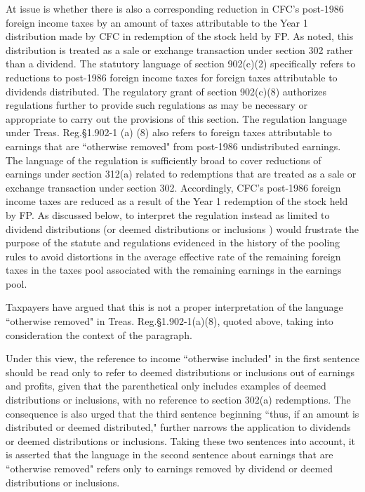 \begin{select}
At issue is whether there is also a corresponding reduction in CFC's post-1986 foreign income taxes by an amount of taxes attributable to the Year 1 distribution made by CFC in redemption of the stock held by FP. As noted, this distribution is treated as a sale or exchange transaction under section 302 rather than a dividend. The statutory language of section 902(c)(2)  specifically refers to reductions to post-1986 foreign income taxes for foreign taxes attributable to dividends distributed. The regulatory grant of section 902(c)(8) authorizes regulations further to provide such regulations as may be necessary or appropriate to carry out the provisions of this section. The regulation language under Treas. Reg.\@ \S1.902-1 (a) (8) also refers to foreign taxes attributable to earnings that are ``otherwise removed" from post-1986 undistributed earnings. The language of the regulation is sufficiently broad to cover reductions of earnings under section 312(a) related to redemptions that are treated as a sale or exchange transaction under section 302. Accordingly, CFC's post-1986 foreign income taxes are reduced as a result of the Year 1 redemption of the stock held by FP. As discussed below, to interpret the regulation instead as limited to dividend distributions (or deemed distributions or inclusions ) would frustrate the purpose of the statute and regulations evidenced in the history of the pooling rules to avoid distortions in the average effective rate of the remaining foreign taxes in the taxes pool associated with the remaining earnings in the earnings pool.

Taxpayers have argued that this is not a proper interpretation of the language ``otherwise removed" in Treas. Reg.\@ \S1.902-1(a)(8), quoted above, taking into consideration the context of the paragraph.

Under this view, the reference to income ``otherwise included" in the first sentence should be read only to refer to deemed distributions or inclusions out of earnings and profits, given that the parenthetical only includes examples of deemed distributions or inclusions, with no reference to section 302(a) redemptions. The consequence is also urged that the third sentence beginning ``thus, if an amount is distributed or deemed distributed," further narrows the application to dividends or deemed distributions or inclusions. Taking these two sentences into account, it is asserted that the language in the second sentence about earnings that are ``otherwise removed" refers only to earnings removed by dividend or deemed distributions or inclusions.


\end{select}
